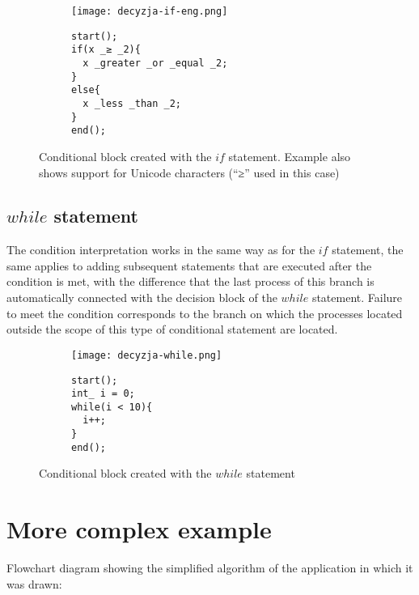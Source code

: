 \begin{figure}[H]
  \begin{subfigure}[t]{0.49\textwidth}
    \vspace{0pt}
    \centering
    \texttt{[image: decyzja-if-eng.png]}
  \end{subfigure}\hfill
  \begin{subfigure}[t]{0.44\textwidth}
    \begin{verbatim}
start();
if(x _≥ _2){
  x _greater _or _equal _2;
}
else{
  x _less _than _2;
}
end();
    \end{verbatim}
  \end{subfigure}%
  \caption{Conditional block created with the $if$ statement. Example also shows support for Unicode characters (``≥'' used in this case)}
\end{figure}

		\subsection { $while$ statement } 
	
		The condition interpretation works in the same way as for the $if$ statement, the same applies to adding subsequent statements that are executed after the condition is met, with the difference that the last process of this branch is automatically connected with the decision block of the $while$ statement. Failure to meet the condition corresponds to the branch on which the processes located outside the scope of this type of conditional statement are located.
	
\begin{figure}[H]
  \begin{subfigure}[t]{0.49\textwidth}
    \vspace{0pt}
    \centering
    \texttt{[image: decyzja-while.png]}
  \end{subfigure}\hfill
  \begin{subfigure}[t]{0.44\textwidth}
    \begin{verbatim}
start();
int_ i = 0;
while(i < 10){
  i++;
}
end();
    \end{verbatim}
  \end{subfigure}%
  \caption{Conditional block created with the $while$ statement}
\end{figure}	

\section{More complex example}
Flowchart diagram showing the simplified algorithm of the application in which it was drawn: {\smallskip}

